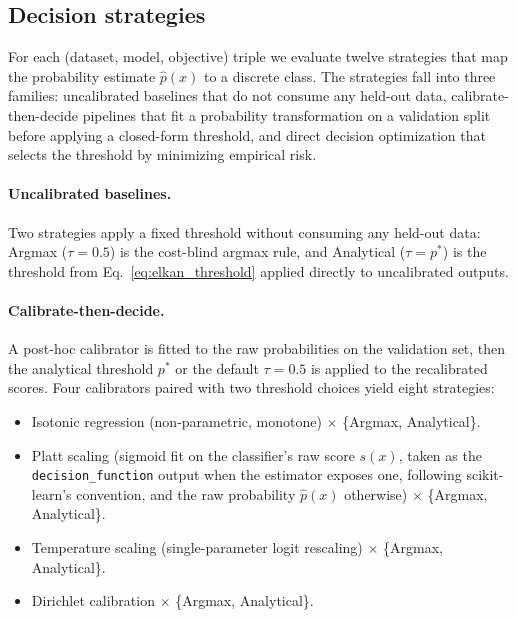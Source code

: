 \subsection{Decision strategies}
For each (dataset, model, objective) triple we evaluate twelve strategies that map the probability estimate $\hat{p}(x)$ to a discrete class. The strategies fall into three families: uncalibrated baselines that do not consume any held-out data, calibrate-then-decide pipelines that fit a probability transformation on a validation split before applying a closed-form threshold, and direct decision optimization that selects the threshold by minimizing empirical risk.

\paragraph{Uncalibrated baselines.} Two strategies apply a fixed threshold without consuming any held-out data: Argmax ($\tau{=}0.5$) is the cost-blind argmax rule, and Analytical ($\tau{=}p^*$) is the \citet{elkan2001foundations} threshold from Eq.~\ref{eq:elkan_threshold} applied directly to uncalibrated outputs.

\paragraph{Calibrate-then-decide.} A post-hoc calibrator is fitted to the raw probabilities on the validation set, then the analytical threshold $p^*$ or the default $\tau{=}0.5$ is applied to the recalibrated scores. Four calibrators paired with two threshold choices yield eight strategies:
\begin{itemize}
    \item Isotonic regression (non-parametric, monotone) $\times$ \{Argmax, Analytical\}.
    \item Platt scaling (sigmoid fit on the classifier's raw score $s(x)$, taken as the \texttt{decision\_function} output when the estimator exposes one, following scikit-learn's convention, and the raw probability $\hat p(x)$ otherwise) $\times$ \{Argmax, Analytical\}.
    \item Temperature scaling (single-parameter logit rescaling) $\times$ \{Argmax, Analytical\}.
    \item Dirichlet calibration \citep{kull2019beyond} $\times$ \{Argmax, Analytical\}.
\end{itemize}

